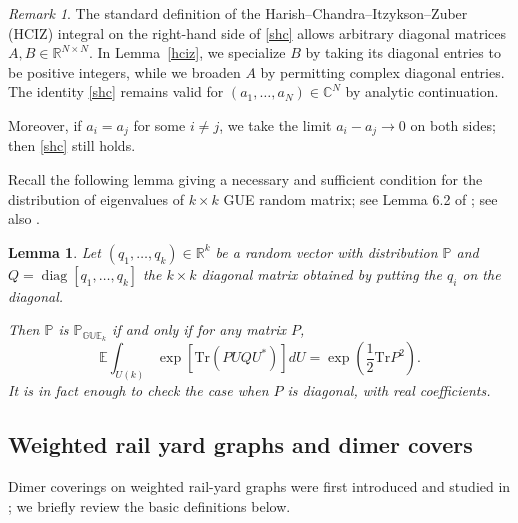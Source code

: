 \documentclass[11pt]{amsart}
\theoremstyle{plain}
\newtheorem{lemma}[theorem]{Lemma}
\theoremstyle{definition}
\theoremstyle{remark}
\newtheorem{remark}[theorem]{Remark}
\newcommand\EE{{\mathbb E}}
\newcommand\RR{{\mathbb R}}
\newcommand\PP{{\mathbb P}}
\newcommand\GUE{{\mathbb {GUE}}}
\numberwithin{equation}{section}
\numberwithin{theorem}{section}
\numberwithin{figure}{section}
\begin{document}
\begin{remark}
The standard definition of the Harish--Chandra–Itzykson–Zuber (HCIZ) integral on the right-hand side of \eqref{shc} allows arbitrary diagonal matrices \(A,B\in \mathbb{R}^{N\times N}\). In Lemma~\ref{hciz}, we specialize \(B\) by taking its diagonal entries to be positive integers, while we broaden \(A\) by permitting complex diagonal entries. The identity \eqref{shc} remains valid for \((a_1,\ldots,a_N)\in \mathbb{C}^N\) by analytic continuation. 

Moreover, if \(a_i = a_j\) for some \(i \neq j\), we take the limit \(a_i - a_j \to 0\) on both sides; then \eqref{shc} still holds.
\end{remark}





Recall the following lemma giving a necessary and sufficient condition for the distribution of eigenvalues of $k\times k$ GUE random matrix; see Lemma 6.2 of \cite{BL17}; see also \cite{GP15}.


\begin{lemma}
  \label{lgue}
  Let $(q_1,\dotsc,q_k)\in\RR^k$ be a random vector with distribution $\PP$ and
  $Q=\operatorname{diag}[q_1,\ldots,q_k]$ the $k\times k$ diagonal matrix
  obtained by putting the $q_i$ on the diagonal.

  Then $\PP$ is $\PP_{\GUE_k}$ if and only if for any matrix $P$,
\begin{equation*}
\EE \int_{U(k)}
\exp[\mathrm{Tr}(PUQU^*)]dU=
\exp\left(\frac{1}{2}\mathrm{Tr}P^2\right).
\end{equation*}
It is in fact enough to check the case when $P$ is diagonal, with real
coefficients.
\end{lemma}

\subsection{Weighted rail yard graphs and dimer covers}

Dimer coverings on weighted rail-yard graphs were first introduced and studied in \cite{bbccr}; we briefly review the basic definitions below.
\end{document}
